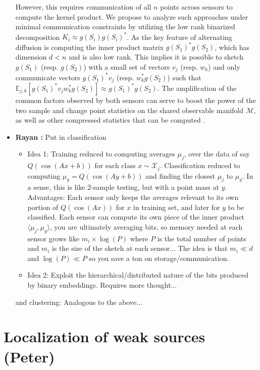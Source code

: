 \documentclass{article}
\newcommand{\comment}[3]{{\color{#1} {\bf #2 :} #3}}
\newcommand{\yoav}[1]{\comment{magenta}{Yoav}{#1}}
\newcommand{\rayan}[1]{\comment{red}{Rayan}{#1}}
\begin{document}
\begin{itemize}
However, this requires communication of all $n$ points across sensors to compute the kernel product.  We propose to analyze such approaches under minimal communication constraints by utilizing the low rank binarized decomposition $K_i \approx g(S_i) g(S_i)^*$.  As the key feature of alternating diffusion is computing the inner product matrix $g(S_1)^* g(S_2)$, which has dimension $d<n$ and is also low rank.  This implies it is possible to sketch $g(S_1)$ (resp. $g(S_2)$) with a small set of vectors $v_j$ (resp. $w_k$) and only communicate vectors $g(S_1)^* v_j$ (resp. $w_k^* g(S_2)$) such that $\mathbb{E}_{j,k}[g(S_1)^* v_j w_k^* g(S_2)] \approx g(S_1)^* g(S_2)$.  The amplification of the common factors observed by both sensors can serve to boost the power of the two sample and change point statistics on the shared observable manifold $\mathcal{M}$, as well as other compressed statistics that can be computed \cite{Griboval}.
\item \rayan{Put in classification \begin{itemize}
    \item Idea 1: Training reduced to computing averages $\mu_j$, over the data of say $Q(\cos(A x+b))$ for each class $x\sim\mathcal{X}_j$. Classification reduced to computing $\mu_y=Q(\cos(Ay+b))$ and finding the closest $\mu_j$ to $\mu_y$. In a sense, this is like 2-sample testing, but with a point mass at $y$. Advantages: Each sensor only keeps the averages relevant to its own portion of $Q(\cos(Ax))$ for $x$ in training set, and later for $y$ to be classified. Each sensor can compute its own piece of the inner product $\langle \mu_j, \mu_y \rangle$, you are ultimately averaging bits, so memory needed at each sensor grows like $m_i\times \log(P)$ where $P$ is the total number of points and $m_i$ is the size of the sketch at each sensor... The idea is that $m_i\ll d$ and $\log(P) \ll P$ so you save a ton on storage/communication. 
    
    \item Idea 2: Exploit the hierarchical/distributed nature of the bits produced by binary embeddings. Requires more thought...
\end{itemize} 
and clustering: Analogous to the above...}
\end{itemize}

\section{Localization of weak sources (Peter)}
\end{document}
